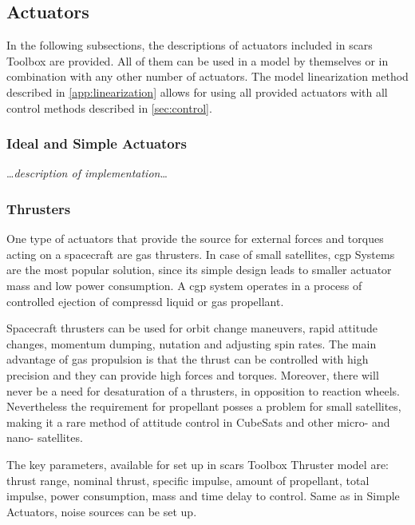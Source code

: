 \subsection{Actuators}
    In the following subsections, the descriptions of actuators included in \ac{scars} Toolbox are provided. All of them can be used in a model by themselves or in combination with any other number of actuators. The model linearization method described in \autoref{app:linearization} allows for using all provided actuators with all control methods described in \autoref{sec:control}. 

    \subsubsection{Ideal and Simple Actuators}
        \dots\textit{description of implementation}\dots


    \subsubsection{Thrusters}
        One type of actuators that provide the source for external forces and torques acting on a spacecraft are gas thrusters. In case of small satellites, \ac{cgp} Systems are the most popular solution, since its simple design leads to smaller actuator mass and low power consumption. A \ac{cgp} system operates in a process of controlled ejection of compressd liquid or gas propellant. 
        
        Spacecraft thrusters can be used for orbit change maneuvers, rapid attitude changes, momentum dumping, nutation and adjusting spin rates. The main advantage of gas propulsion is that the thrust can be controlled with high precision and they can provide high forces and torques. Moreover, there will never be a need for desaturation of a thrusters, in opposition to reaction wheels. Nevertheless the requirement for propellant posses a problem for small satellites, making it a rare method of attitude control in CubeSats and other micro- and nano- satellites. 
        
        The key parameters, available for set up in \ac{scars} Toolbox Thruster model are: thrust range, nominal thrust, specific impulse, amount of propellant, total impulse, power consumption, mass and time delay to control. Same as in Simple Actuators, noise sources can be set up.

